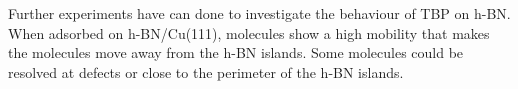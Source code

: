 Further experiments have can done to investigate the behaviour of TBP on h-BN. When adsorbed on h-BN/Cu(111), molecules show a high mobility that makes the molecules move away from the h-BN islands. Some molecules could be resolved at defects or close to the perimeter of the h-BN islands.

